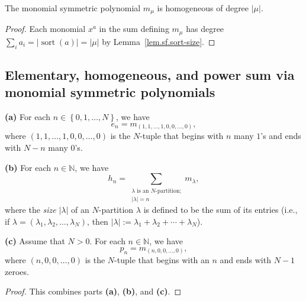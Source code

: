 \begin{lemma}
\label{lem.sf.m-homogeneous}
\leanhelper
\leanok
The monomial symmetric polynomial $m_\mu$ is homogeneous of degree $|\mu|$.
\end{lemma}

\begin{proof}
\leanok
Each monomial $x^a$ in the sum defining $m_\mu$ has degree $\sum_i a_i = |\operatorname{sort}(a)| = |\mu|$
by Lemma~\ref{lem.sf.sort-size}.
\end{proof}

\subsection{Elementary, homogeneous, and power sum via monomial symmetric polynomials}

\begin{proposition}
\label{prop.sf.ehp-through-m}
\leantarget
\leanok
\textbf{(a)} For each $n\in\left\{
0,1,\ldots,N\right\}  $, we have%
\[
e_{n}=m_{\left(  1,1,\ldots,1,0,0,\ldots,0\right)  },
\]
where $\left(  1,1,\ldots,1,0,0,\ldots,0\right)  $ is the $N$-tuple that
begins with $n$ many $1$'s and ends with $N-n$ many $0$'s.

\textbf{(b)} For each $n\in\mathbb{N}$, we have%
\[
h_{n}=\sum_{\substack{\lambda\text{ is an }N\text{-partition;}\\\left\vert
\lambda\right\vert =n}}m_{\lambda},
\]
where the \emph{size} $\left\vert \lambda\right\vert $ of an $N$-partition
$\lambda$ is defined to be the sum of its entries (i.e., if $\lambda=\left(
\lambda_{1},\lambda_{2},\ldots,\lambda_{N}\right)  $, then $\left\vert
\lambda\right\vert :=\lambda_{1}+\lambda_{2}+\cdots+\lambda_{N}$).

\textbf{(c)} Assume that $N>0$. For each $n\in\mathbb{N}$, we have%
\[
p_{n}=m_{\left(  n,0,0,\ldots,0\right)  },
\]
where $\left(  n,0,0,\ldots,0\right)  $ is the $N$-tuple that begins with an
$n$ and ends with $N-1$ zeroes.
\end{proposition}

\begin{proof}
This combines parts \textbf{(a)}, \textbf{(b)}, and \textbf{(c)}.
\end{proof}

